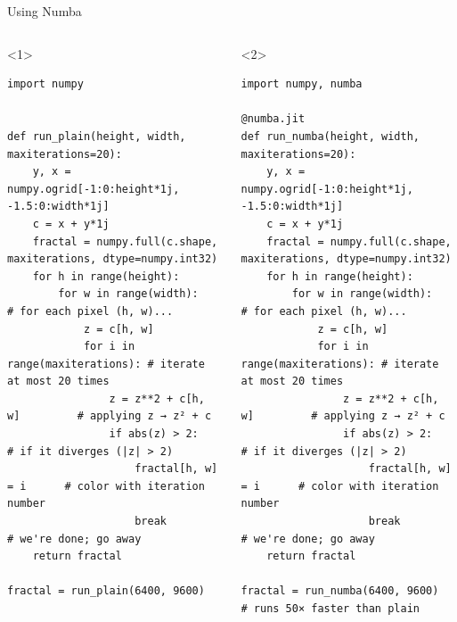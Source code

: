 \documentclass[aspectratio=169]{beamer}
\begin{document}
\begin{frame}[fragile]{Using Numba}
\begin{columns}
\small
\begin{onlyenv}<1>
\begin{verbatim}
import numpy


def run_plain(height, width, maxiterations=20):
    y, x = numpy.ogrid[-1:0:height*1j, -1.5:0:width*1j]
    c = x + y*1j
    fractal = numpy.full(c.shape, maxiterations, dtype=numpy.int32)
    for h in range(height):
        for w in range(width):             # for each pixel (h, w)...
            z = c[h, w]
            for i in range(maxiterations): # iterate at most 20 times
                z = z**2 + c[h, w]         # applying z → z² + c
                if abs(z) > 2:             # if it diverges (|z| > 2)
                    fractal[h, w] = i      # color with iteration number
                    break                  # we're done; go away
    return fractal

fractal = run_plain(6400, 9600)
\end{verbatim}
\end{onlyenv}
\begin{onlyenv}<2>
\begin{verbatim}
import numpy, numba

@numba.jit
def run_numba(height, width, maxiterations=20):
    y, x = numpy.ogrid[-1:0:height*1j, -1.5:0:width*1j]
    c = x + y*1j
    fractal = numpy.full(c.shape, maxiterations, dtype=numpy.int32)
    for h in range(height):
        for w in range(width):             # for each pixel (h, w)...
            z = c[h, w]
            for i in range(maxiterations): # iterate at most 20 times
                z = z**2 + c[h, w]         # applying z → z² + c
                if abs(z) > 2:             # if it diverges (|z| > 2)
                    fractal[h, w] = i      # color with iteration number
                    break                  # we're done; go away
    return fractal

fractal = run_numba(6400, 9600)            # runs 50× faster than plain
\end{verbatim}
\end{onlyenv}
\end{columns}
\end{frame}
\end{document}
